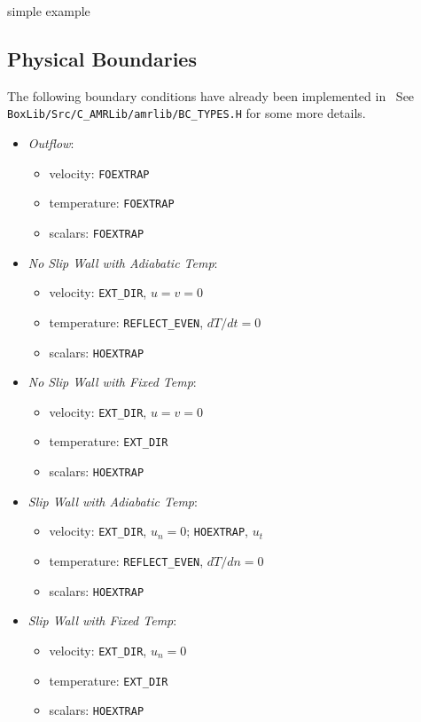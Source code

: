 {\color{red}simple example}


\subsection{Physical Boundaries}

The following boundary conditions have already been implemented in
\castro\ See {\tt BoxLib/Src/C\_AMRLib/amrlib/BC\_TYPES.H} for some
more details.
\begin{itemize}
\item {\it Outflow}:
  \begin{itemize}
    \item velocity: {\tt FOEXTRAP}
    \item temperature: {\tt FOEXTRAP}
    \item scalars: {\tt FOEXTRAP}
  \end{itemize}
  
\item {\it No Slip Wall with Adiabatic Temp}:
  \begin{itemize}
  \item velocity: {\tt EXT\_DIR}, $u=v=0$
  \item temperature: {\tt REFLECT\_EVEN}, $dT/dt=0$
  \item scalars: {\tt HOEXTRAP}
  \end{itemize}

\item {\it No Slip Wall with Fixed Temp}:
  \begin{itemize}
  \item velocity: {\tt EXT\_DIR}, $u=v=0$
  \item temperature: {\tt EXT\_DIR}
  \item scalars: {\tt HOEXTRAP}
  \end{itemize}
    
\item {\it Slip Wall with Adiabatic Temp}:
  \begin{itemize}
  \item velocity: {\tt EXT\_DIR}, $u_n=0$; {\tt HOEXTRAP}, $u_t$
  \item temperature: {\tt REFLECT\_EVEN}, $dT/dn=0$
  \item scalars: {\tt HOEXTRAP}
  \end{itemize}
  
\item {\it Slip Wall with Fixed Temp}:
  \begin{itemize}
  \item velocity: {\tt EXT\_DIR}, $u_n=0$
  \item temperature: {\tt EXT\_DIR}
  \item scalars: {\tt HOEXTRAP}
  \end{itemize}

\end{itemize}

